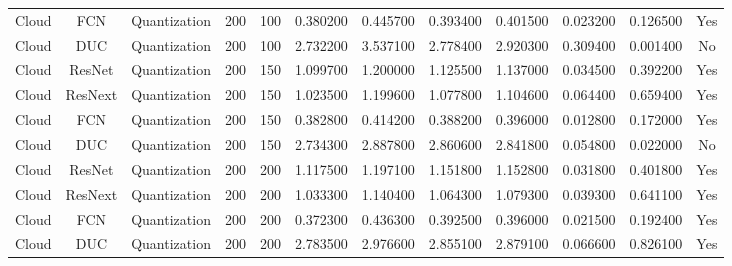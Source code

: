 \begin{tabular}{|c||c||c||c||c||c||c||c||c||c||c||c|}
Cloud & FCN & Quantization & 200 & 100 & 0.380200 & 0.445700 & 0.393400 & 0.401500 & 0.023200 & 0.126500 & Yes \\
Cloud & DUC & Quantization & 200 & 100 & 2.732200 & 3.537100 & 2.778400 & 2.920300 & 0.309400 & 0.001400 & No \\
Cloud & ResNet & Quantization & 200 & 150 & 1.099700 & 1.200000 & 1.125500 & 1.137000 & 0.034500 & 0.392200 & Yes \\
Cloud & ResNext & Quantization & 200 & 150 & 1.023500 & 1.199600 & 1.077800 & 1.104600 & 0.064400 & 0.659400 & Yes \\
Cloud & FCN & Quantization & 200 & 150 & 0.382800 & 0.414200 & 0.388200 & 0.396000 & 0.012800 & 0.172000 & Yes \\
Cloud & DUC & Quantization & 200 & 150 & 2.734300 & 2.887800 & 2.860600 & 2.841800 & 0.054800 & 0.022000 & No \\
Cloud & ResNet & Quantization & 200 & 200 & 1.117500 & 1.197100 & 1.151800 & 1.152800 & 0.031800 & 0.401800 & Yes \\
Cloud & ResNext & Quantization & 200 & 200 & 1.033300 & 1.140400 & 1.064300 & 1.079300 & 0.039300 & 0.641100 & Yes \\
Cloud & FCN & Quantization & 200 & 200 & 0.372300 & 0.436300 & 0.392500 & 0.396000 & 0.021500 & 0.192400 & Yes \\
Cloud & DUC & Quantization & 200 & 200 & 2.783500 & 2.976600 & 2.855100 & 2.879100 & 0.066600 & 0.826100 & Yes \\
\bottomrule
\end{tabular}

